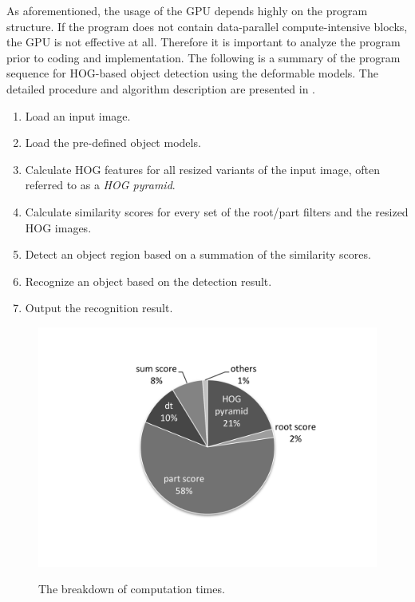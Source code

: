 As aforementioned, the usage of the GPU depends highly on the program
structure.
If the program does not contain data-parallel compute-intensive blocks,
the GPU is not effective at all.
Therefore it is important to analyze the program prior to coding and
implementation.
The following is a summary of the program sequence for HOG-based object
detection using the deformable models.
The detailed procedure and algorithm description are presented in
\cite{Felzenszwalb10, Niknejad12}.

\begin{enumerate}
\item Load an input image.
\item Load the pre-defined object models.
\item Calculate HOG features for all resized variants of the input
      image, often referred to as a \textit{HOG pyramid}.
\item Calculate similarity scores for every set of the root/part filters
      and the resized HOG images.
\item Detect an object region based on a summation of the similarity
      scores.
\item Recognize an object based on the detection result.
\item Output the recognition result.
\end{enumerate}

\begin{figure}[t]
 \begin{center}
  \includegraphics[width=\hsize]{fig/breakdown.pdf}\\
  \caption{The breakdown of computation times.}
  \label{fig:breakdown}
 \end{center}
\end{figure}

